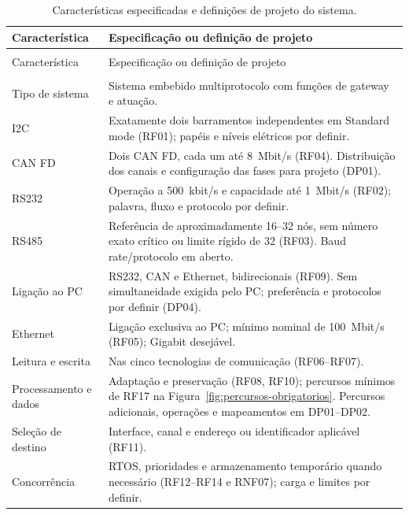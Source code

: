 \begingroup
\small
{}
\setlength{\tabcolsep}{4pt}
\renewcommand{\arraystretch}{1.12}
\begin{longtable}{@{}>{\raggedright\arraybackslash}p{}>{\raggedright\arraybackslash}p{}@{}}
\caption{Características especificadas e definições de projeto do sistema.}\label{tab:caracteristicas-preliminares}\\
\toprule
\rowcolor{LasetTint}
Característica & Especificação ou definição de projeto \\
\midrule
\endfirsthead
\multicolumn{2}{c}{\tablename~\thetable{} (continuação)}\\
\toprule
\rowcolor{LasetTint}
Característica & Especificação ou definição de projeto \\
\midrule
\endhead
\midrule
\multicolumn{2}{r}{Continua na página seguinte}\\
\endfoot
\bottomrule
\endlastfoot
Tipo de sistema & Sistema embebido multiprotocolo com funções de gateway e atuação. \\
I2C & Exatamente dois barramentos independentes em Standard mode (RF01); papéis e níveis elétricos por definir. \\
CAN FD & Dois CAN FD, cada um até 8~Mbit/s (RF04). Distribuição dos canais e configuração das fases para projeto (DP01). \\
RS232 & Operação a 500~kbit/s e capacidade até 1~Mbit/s (RF02); palavra, fluxo e protocolo por definir. \\
RS485 & Referência de aproximadamente 16--32 nós, sem número exato crítico ou limite rígido de 32 (RF03). Baud rate/protocolo em aberto. \\
Ligação ao PC & RS232, CAN e Ethernet, bidirecionais (RF09). Sem simultaneidade exigida pelo PC; preferência e protocolos por definir (DP04). \\
Ethernet & Ligação exclusiva ao PC; mínimo nominal de 100~Mbit/s (RF05); Gigabit desejável. \\
Leitura e escrita & Nas cinco tecnologias de comunicação (RF06--RF07). \\
Processamento e dados & Adaptação e preservação (RF08, RF10); percursos mínimos de RF17 na Figura~\ref{fig:percursos-obrigatorios}. Percursos adicionais, operações e mapeamentos em DP01--DP02. \\
Seleção de destino & Interface, canal e endereço ou identificador aplicável (RF11). \\
Concorrência & RTOS, prioridades e armazenamento temporário quando necessário (RF12--RF14 e RNF07); carga e limites por definir. \\

\end{longtable}
